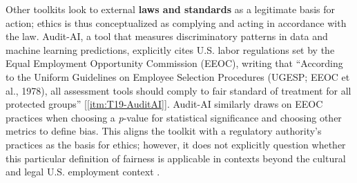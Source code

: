 \documentclass[acmsmall]{acmart}
\begin{document}
Other toolkits look to external \textbf{laws and standards} as a legitimate basis for action; ethics is thus conceptualized as complying and acting in accordance with the law. Audit-AI, a tool that measures discriminatory patterns in data and machine learning predictions, explicitly cites U.S. labor regulations set by the Equal Employment Opportunity Commission (EEOC), writing that ``According to the Uniform Guidelines on Employee Selection Procedures (UGESP; EEOC et al., 1978), all assessment tools should comply to fair standard of treatment for all protected groups'' [\ref{itm:T19-AuditAI}]. Audit-AI similarly draws on EEOC practices when choosing a \textit{p}-value for statistical significance and choosing other metrics to define bias. This aligns the toolkit with a regulatory authority’s practices as the basis for ethics; however, it does not explicitly question whether this particular definition of fairness is applicable in contexts beyond the cultural and legal U.S. employment context \cite[cf.][]{watkins2022four}. 
\end{document}
